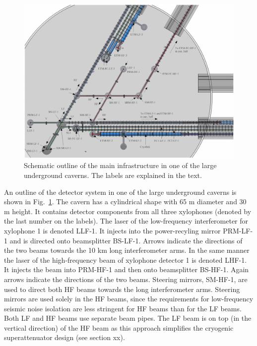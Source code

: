 \begin{figure}[htbp!]
\centering
\includegraphics[width=23cm, angle=90]{./Sec_SiteInfra/Figures/infra3.jpg}
\caption{Schematic outline of the main infrastructure in one of the large underground caverns.
The labels are explained in the text.}
\label{fig:infra3}
\end{figure}
An outline of the detector system in one of the large
underground caverns is shown in Fig.~\ref{fig:infra3}. 
The cavern has a cylindrical shape with 65 m diameter and 30 m height.
It contains detector components from all three
xylophones (denoted by the last number on the labels). 
The laser of the low-frequency
interferometer for xylophone 1 is denoted LLF-1. It injects into the power-recyling mirror
PRM-LF-1 and is directed onto beamsplitter BS-LF-1. Arrows indicate the directions
of the two beams towards the 10 km long interferometer arms. In the same manner the
laser of the high-frequency beam of xylophone detector 1 is denoted LHF-1. It injects
the beam into PRM-HF-1 and then onto beamsplitter BS-HF-1. Again arrows indicate
the directions of the two beams. Steering mirrors, SM-HF-1, are used
to direct both HF beams towards the long interferometer arms. Steering mirrors are
used solely in the HF beams, since the requirements
for low-frequency seismic noise isolation are less stringent for HF beams than
for the LF beams. Both LF and HF beams use separate beam pipes. 
The LF beam is on top (in the vertical direction) of the HF beam as this approach
simplifies the cryogenic superattenuator design (see section xx).

